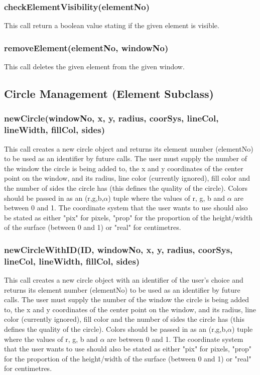 \documentclass{acm_proc_article-sp}
\begin{document}
\subsubsection{checkElementVisibility(elementNo)}
This call return a boolean value stating if the given element is visible.
\subsubsection{removeElement(elementNo, windowNo)}
This call deletes the given element from the given window.
\subsection{Circle Management (Element Subclass)}
\subsubsection{newCircle(windowNo, x, y, radius, coorSys, lineCol, lineWidth, fillCol, sides)}
This call creates a new circle object and returns its element number (elementNo) to be used as an identifier by future calls. The user must supply the number of the window the circle is being added to, the x and y coordinates of the center point on the window, and its radius, line color (currently ignored), fill color and the number of sides the circle has (this defines the quality of the circle). Colors should be passed in as an (r,g,b,$\alpha$) tuple where the values of r, g, b and $\alpha$ are between 0 and 1. The coordinate system that the user wants to use should also be stated as either "pix" for pixels, "prop" for the proportion of the height/width of the surface (between 0 and 1) or "real" for centimetres.
\subsubsection{newCircleWithID(ID, windowNo, x, y, radius, coorSys, lineCol, lineWidth, fillCol, sides)}
This call creates a new circle object with an identifier of the user's choice and returns its element number (elementNo) to be used as an identifier by future calls. The user must supply the number of the window the circle is being added to, the x and y coordinates of the center point on the window, and its radius, line color (currently ignored), fill color and the number of sides the circle has (this defines the quality of the circle). Colors should be passed in as an (r,g,b,$\alpha$) tuple where the values of r, g, b and $\alpha$ are between 0 and 1. The coordinate system that the user wants to use should also be stated as either "pix" for pixels, "prop" for the proportion of the height/width of the surface (between 0 and 1) or "real" for centimetres.
\end{document}
